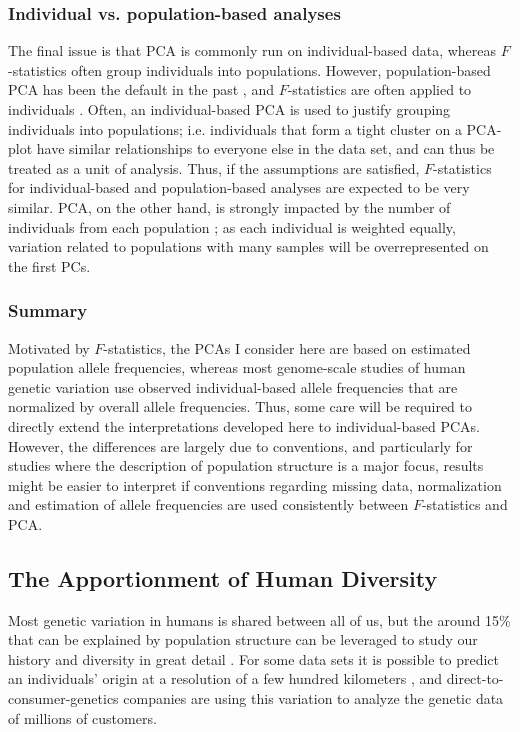 \documentclass[12pt,fullpage, a4paper]{article}
\begin{document}
\subsubsection{Individual vs. population-based analyses}
The final issue is that PCA is commonly run on individual-based data, whereas $F$-statistics often group individuals into populations. However, population-based PCA has been the default in the past \citep{cavalli-sforza1994}, and $F$-statistics are often applied to individuals \citep[e.g.][]{green2010, massilani2020, yang2020}. Often, an individual-based PCA is used to justify grouping individuals into populations; i.e. individuals that form a tight cluster on a PCA-plot have similar relationships to everyone else in the data set, and can thus be treated as a unit of analysis. Thus, if the assumptions are satisfied, $F$-statistics for individual-based and population-based analyses are expected to be very similar. PCA, on the other hand, is strongly impacted by the number of individuals from each population \citep[e.g.][]{mcvean2009}; as each individual is weighted equally, variation related to populations with many samples will be overrepresented on the first PCs.

\subsubsection{Summary}
Motivated by $F$-statistics, the PCAs I consider here are based on estimated population allele frequencies, whereas most genome-scale studies of human genetic variation use observed individual-based allele frequencies that are normalized by overall allele frequencies. Thus, some care will be required to directly extend the interpretations developed here to individual-based PCAs. However, the differences are largely due to conventions, and particularly for studies where the description of population structure is a major focus, results might be easier to interpret if conventions regarding missing data, normalization and estimation of allele frequencies are used consistently between $F$-statistics and PCA.

\subsection{The Apportionment of Human Diversity}
Most genetic variation in humans is shared between all of us, but the around 15\% that can be explained by population structure can be leveraged to study our history and diversity in great detail \citep{dobzhansky1972, cavalli-sforza1994, novembre2022}. For some data sets it is possible to predict an individuals' origin at a resolution of a few hundred kilometers \citep{novembre2008, leslie2015}, and direct-to-consumer-genetics companies are using this variation to analyze the genetic data of millions of customers. 
\end{document}
